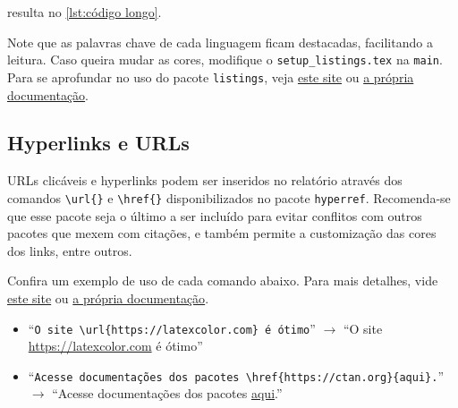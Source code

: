         resulta no \autoref{lst:código longo}.
        

        Note que as palavras chave de cada linguagem ficam destacadas, facilitando a leitura.
        Caso queira mudar as cores, modifique o {\tt setup\_listings.tex} na {\tt main}.
        Para se aprofundar no uso do pacote {\tt listings}, veja 
        \href{https://www.overleaf.com/learn/latex/Code_listing}{este site} ou 
        \href{http://users.ece.utexas.edu/~garg/dist/listings.pdf}{a própria documentação}.


    \subsection{Hyperlinks e URLs}
        URLs clicáveis e hyperlinks podem ser inseridos no relatório através dos comandos
        \verb|\url{}| e \verb|\href{}| disponibilizados no pacote {\tt hyperref}.
        Recomenda-se que esse pacote seja o último a ser incluído para evitar conflitos com outros pacotes que mexem com citações,
        e também permite a customização das cores dos links, entre outros.

        Confira um exemplo de uso de cada comando abaixo.
        Para mais detalhes, vide 
        \href{https://www.overleaf.com/learn/latex/Hyperlinks}{este site} ou 
        \href{https://linorg.usp.br/CTAN/macros/latex/contrib/hyperref/doc/hyperref-doc.pdf}{a própria documentação}.
        \begin{itemize}
            \item 
            ``\verb|O site \url{https://latexcolor.com} é ótimo|'' $\to$
            ``O site \url{https://latexcolor.com} é ótimo''

            \item 
            ``\verb|Acesse documentações dos pacotes \href{https://ctan.org}{aqui}.|'' $\to$
            ``Acesse documentações dos pacotes \href{https://ctan.org}{aqui}.''
        \end{itemize}
    
